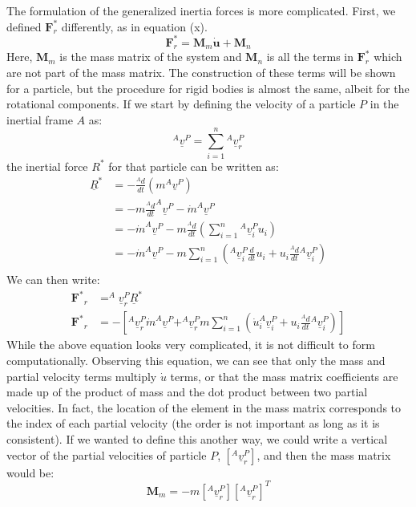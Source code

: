 \documentclass[twocolumn,10pt]{asme2e}
\begin{document}
The formulation of the generalized inertia forces is more complicated.
First, we defined $\mathbf{F}_r^*$ differently, as in equation (x).
\begin{equation}
\mathbf{F}_r^* = \mathbf{M}_m \mathbf{\dot{u}} + \mathbf{M}_n
\end{equation}
Here, $\mathbf{M}_m$ is the mass matrix of the system and $\mathbf{M}_n$ is all
the terms in $\mathbf{F}_r^*$ which are not part of the mass matrix.
The construction of these terms will be shown for a particle, but the procedure
for rigid bodies is almost the same, albeit for the rotational components.
If we start by defining the velocity of a particle $P$ in the inertial frame
$A$ as:
\begin{equation}
^{A}\underline{v}^{P} = \sum_{i=1}^{n} {} ^{A}\underline{v}_{r}^{P}
\end{equation}
the inertial force $R^*$ for that particle can be written as:
\begin{align}
\underline{R}^* &= -\frac{^{A} d}{dt}(m ^A\underline{v}^P) \\
&= -m \frac{^{A}d}{dt}^A\underline{v}^P - \dot{m} ^A\underline{v}^P \\
&= -\dot{m} ^A\underline{v}^P - m \frac{^{A}d}{dt}\left(\sum_{i=1}^{n}{} ^A
\underline{v}^P_i u_i \right) \\
&= -\dot{m} ^A\underline{v}^P - m \sum_{i=1}^{n} \left( ^A\underline{v}_i^P
\frac{d}{dt}u_i + u_i \frac{^{A}d}{dt} {}^A\underline{v}^P_i \right) \\
\end{align}
We can then write:
\begin{align}
\mathbf{F^*}_r &= ^A\underline{v}^P_r \underline{R}^{*} \\
\mathbf{F^*}_r &= - \left[
                   ^A\underline{v}^P_r \dot{m} ^A\underline{v}^P +
                   ^A\underline{v}^P_r m \sum_{i=1}^{n} \left(
                   \dot{u}_i ^A\underline{v}^P_i + u_i
                   \frac{^{A}d}{dt} {}^A\underline{v}^P_i
                   \right)
                   \right]
\end{align}
While the above equation looks very complicated, it is not difficult to form
computationally.
Observing this equation, we can see that only the mass and partial velocity
terms multiply $\dot{u}$ terms, or that the mass matrix coefficients are made
up of the product of mass and the dot product between two partial velocities.
In fact, the location of the element in the mass matrix corresponds to the
index of each partial velocity (the order is not important as long as it is
consistent).
If we wanted to define this another way, we could write a vertical vector of
the partial velocities of particle $P$, $[^A\underline{v}^P_r]$, and then the
mass matrix would be:
\begin{equation}
\mathbf{M}_m = -m \left[^A\underline{v}_r^P\right] \left[^A\underline{v}_r^P \right]^T
\end{equation}
\end{document}
